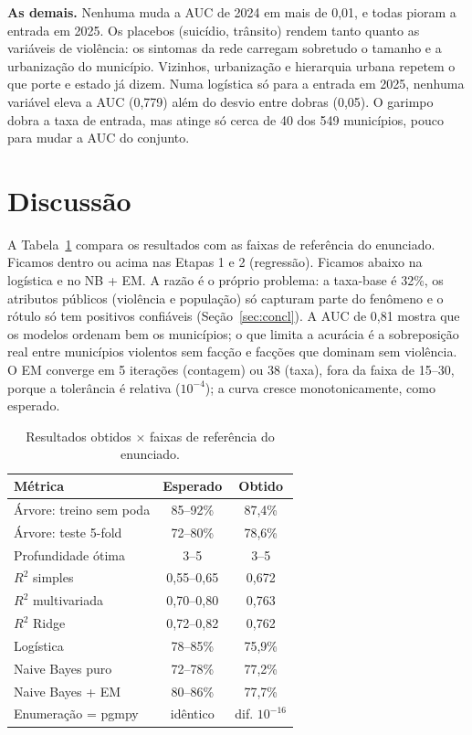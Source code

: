 \documentclass[10pt,a4paper,twocolumn]{article}
\begin{document}
\textbf{As demais.} Nenhuma muda a AUC de 2024 em mais de 0,01, e todas pioram a entrada em 2025.
Os placebos (suicídio, trânsito) rendem tanto quanto as variáveis de violência: os sintomas da rede
carregam sobretudo o tamanho e a urbanização do município. Vizinhos, urbanização e hierarquia
urbana repetem o que porte e estado já dizem. Numa logística só para a entrada em 2025, nenhuma
variável eleva a AUC (0,779) além do desvio entre dobras (0,05). O garimpo dobra a taxa de entrada,
mas atinge só cerca de 40 dos 549 municípios, pouco para mudar a AUC do conjunto.

\section{Discussão}
A Tabela~\ref{tab:gab} compara os resultados com as faixas de referência do enunciado. Ficamos
dentro ou acima nas Etapas 1 e 2 (regressão). Ficamos abaixo na logística e no NB + EM. A razão é o
próprio problema: a taxa-base é 32\%, os atributos públicos (violência e população) só capturam
parte do fenômeno e o rótulo só tem positivos confiáveis (Seção~\ref{sec:concl}). A AUC de 0,81 mostra que os modelos ordenam bem os
municípios; o que limita a acurácia é a sobreposição real entre municípios violentos sem facção e
facções que dominam sem violência. O EM converge em 5 iterações (contagem) ou 38 (taxa), fora da
faixa de 15--30, porque a tolerância é relativa ($10^{-4}$); a curva cresce monotonicamente, como
esperado.

\begin{table}[H]\centering\small
\begin{tabular}{lcc}\toprule
Métrica & Esperado & Obtido\\\midrule
Árvore: treino sem poda & 85--92\% & 87,4\%\\
Árvore: teste 5-fold & 72--80\% & 78,6\%\\
Profundidade ótima & 3--5 & 3--5\\
$R^2$ simples & 0,55--0,65 & 0,672\\
$R^2$ multivariada & 0,70--0,80 & 0,763\\
$R^2$ Ridge & 0,72--0,82 & 0,762\\
Logística & 78--85\% & 75,9\%\\
Naive Bayes puro & 72--78\% & 77,2\%\\
Naive Bayes + EM & 80--86\% & 77,7\%\\
Enumeração = pgmpy & idêntico & dif. $10^{-16}$\\\bottomrule
\end{tabular}\caption{Resultados obtidos $\times$ faixas de referência do enunciado.}\label{tab:gab}\end{table}
\end{document}

